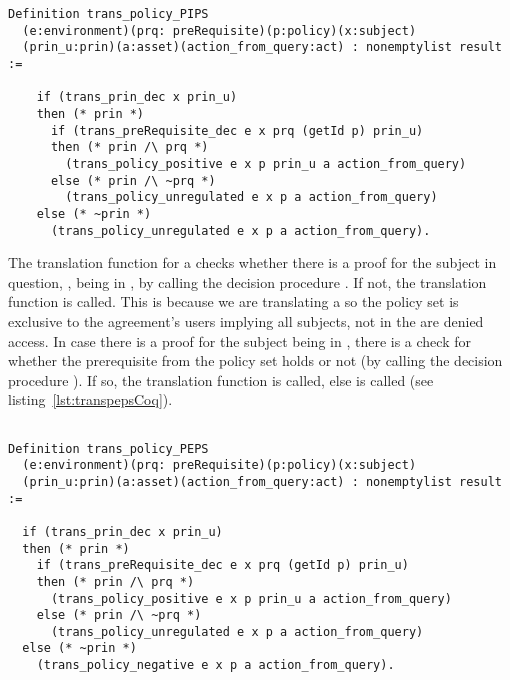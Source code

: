 \begin{minipage}[c]{0.95\textwidth}
\begin{lstlisting}
Definition trans_policy_PIPS
  (e:environment)(prq: preRequisite)(p:policy)(x:subject)
  (prin_u:prin)(a:asset)(action_from_query:act) : nonemptylist result :=
  
    if (trans_prin_dec x prin_u)
    then (* prin *)
      if (trans_preRequisite_dec e x prq (getId p) prin_u)
      then (* prin /\ prq *)
        (trans_policy_positive e x p prin_u a action_from_query)                           
      else (* prin /\ ~prq *)
        (trans_policy_unregulated e x p a action_from_query)
    else (* ~prin *)
      (trans_policy_unregulated e x p a action_from_query).
\end{lstlisting}
\end{minipage}


The  translation function for a  checks whether there is a proof for the subject in question, , being in , by calling the decision procedure . If not, the translation function  is called. This is because we are translating a  so the policy set is exclusive to the agreement's users implying all subjects, not in the  are denied access. In case there is a proof for the subject  being in , there is a check for whether the prerequisite from the policy set holds or not (by calling the decision procedure ). If so, the translation function  is called, else  is called (see listing~\ref{lst:transpepsCoq}).

\begin{lstlisting}

Definition trans_policy_PEPS
  (e:environment)(prq: preRequisite)(p:policy)(x:subject)
  (prin_u:prin)(a:asset)(action_from_query:act) : nonemptylist result :=
  
  if (trans_prin_dec x prin_u)
  then (* prin *)
    if (trans_preRequisite_dec e x prq (getId p) prin_u)
    then (* prin /\ prq *)
      (trans_policy_positive e x p prin_u a action_from_query)
    else (* prin /\ ~prq *)
      (trans_policy_unregulated e x p a action_from_query)
  else (* ~prin *)
    (trans_policy_negative e x p a action_from_query).

\end{lstlisting}


